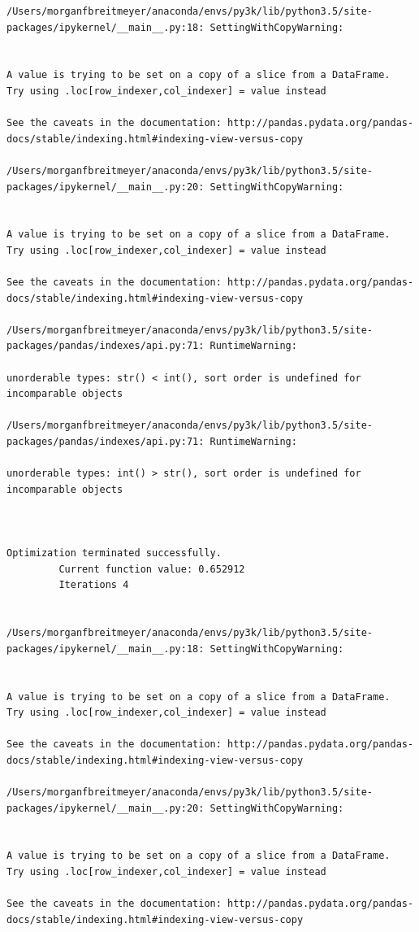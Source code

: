\begin{lstlisting}
/Users/morganfbreitmeyer/anaconda/envs/py3k/lib/python3.5/site-packages/ipykernel/__main__.py:18: SettingWithCopyWarning:


A value is trying to be set on a copy of a slice from a DataFrame.
Try using .loc[row_indexer,col_indexer] = value instead

See the caveats in the documentation: http://pandas.pydata.org/pandas-docs/stable/indexing.html#indexing-view-versus-copy

/Users/morganfbreitmeyer/anaconda/envs/py3k/lib/python3.5/site-packages/ipykernel/__main__.py:20: SettingWithCopyWarning:


A value is trying to be set on a copy of a slice from a DataFrame.
Try using .loc[row_indexer,col_indexer] = value instead

See the caveats in the documentation: http://pandas.pydata.org/pandas-docs/stable/indexing.html#indexing-view-versus-copy

/Users/morganfbreitmeyer/anaconda/envs/py3k/lib/python3.5/site-packages/pandas/indexes/api.py:71: RuntimeWarning:

unorderable types: str() < int(), sort order is undefined for incomparable objects

/Users/morganfbreitmeyer/anaconda/envs/py3k/lib/python3.5/site-packages/pandas/indexes/api.py:71: RuntimeWarning:

unorderable types: int() > str(), sort order is undefined for incomparable objects



Optimization terminated successfully.
         Current function value: 0.652912
         Iterations 4


/Users/morganfbreitmeyer/anaconda/envs/py3k/lib/python3.5/site-packages/ipykernel/__main__.py:18: SettingWithCopyWarning:


A value is trying to be set on a copy of a slice from a DataFrame.
Try using .loc[row_indexer,col_indexer] = value instead

See the caveats in the documentation: http://pandas.pydata.org/pandas-docs/stable/indexing.html#indexing-view-versus-copy

/Users/morganfbreitmeyer/anaconda/envs/py3k/lib/python3.5/site-packages/ipykernel/__main__.py:20: SettingWithCopyWarning:


A value is trying to be set on a copy of a slice from a DataFrame.
Try using .loc[row_indexer,col_indexer] = value instead

See the caveats in the documentation: http://pandas.pydata.org/pandas-docs/stable/indexing.html#indexing-view-versus-copy


\end{lstlisting}
